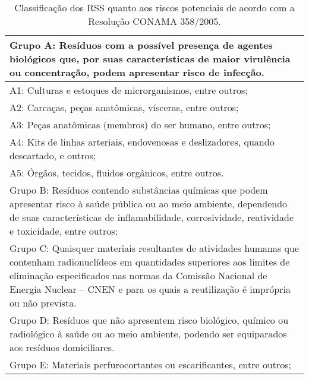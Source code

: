 \begin{table}[htbp]
	\centering
	\caption{Classificação dos RSS quanto aos riscos potenciais de acordo com a Resolução CONAMA 358/2005.}
	\begin{tabular}{|p{35.715em}|}
		\toprule
		\rowcolor[rgb]{ .969,  .588,  .275} Grupo A: Resíduos com a possível presença de agentes biológicos que, por suas características de maior virulência ou concentração, podem apresentar risco de infecção. \\
		\midrule
		\rowcolor[rgb]{ .969,  .588,  .275} A1: Culturas e estoques de microrganismos, entre outros; \\
		\midrule
		\rowcolor[rgb]{ .969,  .588,  .275} A2: Carcaças, peças anatômicas, vísceras, entre outros; \\
		\midrule
		\rowcolor[rgb]{ .969,  .588,  .275} A3: Peças anatômicas (membros) do ser humano, entre outros; \\
		\midrule
		\rowcolor[rgb]{ .969,  .588,  .275} A4: Kits de linhas arteriais, endovenosas e deslizadores, quando descartado, e outros; \\
		\midrule
		\rowcolor[rgb]{ .969,  .588,  .275} A5: Órgãos, tecidos, fluidos orgânicos, entre outros. \\
		\midrule
		\rowcolor[rgb]{ .984,  .831,  .706} Grupo B: Resíduos contendo substâncias químicas que podem apresentar risco à saúde pública ou ao meio ambiente, dependendo de suas características de inflamabilidade, corrosividade, reatividade e toxicidade, entre outros; \\
		\midrule
		\rowcolor[rgb]{ .969,  .588,  .275} Grupo C: Quaisquer materiais resultantes de atividades humanas que contenham radionuclídeos em quantidades superiores aos limites de eliminação especificados nas normas da Comissão Nacional de Energia Nuclear – CNEN e para os quais a reutilização é imprópria ou não prevista. \\
		\midrule
		\rowcolor[rgb]{ .984,  .831,  .706} Grupo D: Resíduos que não apresentem risco biológico, químico ou radiológico à saúde ou ao meio ambiente, podendo ser equiparados aos resíduos domiciliares. \\
		\midrule
		\rowcolor[rgb]{ .969,  .588,  .275} Grupo E: Materiais perfurocortantes ou escarificantes, entre outros; \\
		\bottomrule
	\end{tabular}%
		\label{tab:classificacao_rss}
\end{table}%

%

